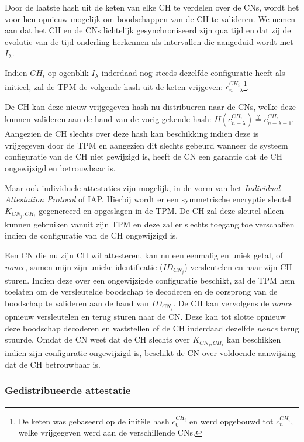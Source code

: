 Door de laatste hash uit de keten van elke CH te verdelen over de CNs, wordt
het voor hen opnieuw mogelijk om boodschappen van de CH te valideren. We nemen
aan dat het CH en de CNs lichtelijk gesynchroniseerd zijn qua tijd en dat zij
de evolutie van de tijd onderling herkennen als intervallen die aangeduid wordt
met $I_\lambda$.

Indien $CH_i$ op ogenblik $I_\lambda$ inderdaad nog steeds dezelfde
configuratie heeft als initieel, zal de TPM de volgende hash uit de keten
vrijgeven: $c_{n-\lambda}^{CH_i}$\footnote{De keten was gebaseerd op de
init\"ele hash $c_0^{CH_i}$ en werd opgebouwd tot $c_n^{CH_i}$, welke
vrijgegeven werd aan de verschillende CNs.}.

De CH kan deze nieuw vrijgegeven hash nu distribueren naar de CNs, welke deze
kunnen valideren aan de hand van de vorig gekende hash:
$H(c_{n-\lambda}^{CH_i}) \overset{?}{=} c_{n-\lambda+1}^{CH_i}$. Aangezien de
CH slechts over deze hash kan beschikking indien deze is vrijgegeven door de
TPM en aangezien dit slechts gebeurd wanneer de systeem configuratie van de CH
niet gewijzigd is, heeft de CN een garantie dat de CH ongewijzigd en
betrouwbaar is.

Maar ook individuele attestaties zijn mogelijk, in de vorm van het
\emph{Individual Attestation Protocol} of IAP. Hierbij wordt er een
symmetrische encryptie sleutel $K_{CN_j,CH_i}$ gegenereerd en opgeslagen in de
TPM. De CH zal deze sleutel alleen kunnen gebruiken vanuit zijn TPM en deze zal
er slechts toegang toe verschaffen indien de configuratie van de CH ongewijzigd
is.

Een CN die nu zijn CH wil attesteren, kan nu een eenmalig en uniek getal, of
\emph{nonce}, samen mijn zijn unieke identificatie ($ID_{CN_j}$) versleutelen
en naar zijn CH sturen. Indien deze over een ongewijzigde configuratie
beschikt, zal de TPM hem toelaten om de versleutelde boodschap te decoderen en
de oorsprong van de boodschap te valideren aan de hand van $ID_{CN_j}$. De CH
kan vervolgens de \emph{nonce} opnieuw versleutelen en terug sturen naar de CN.
Deze kan tot slotte opnieuw deze boodschap decoderen en vaststellen of de CH
inderdaad dezelfde \emph{nonce} terug stuurde. Omdat de CN weet dat de CH
slechts over $K_{CN_j,CH_i}$ kan beschikken indien zijn configuratie
ongewijzigd is, beschikt de CN over voldoende aanwijzing dat de CH betrouwbaar
is.


\subsubsection*{Gedistribueerde attestatie}

